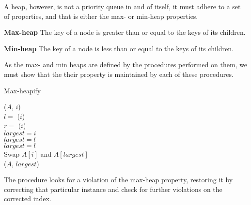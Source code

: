 A heap, however, is not a priority queue in and of itself, it must adhere to
a set of properties, and that is either the max- or min-heap properties.
\begin{description}
	\item \textbf{Max-heap} The key of a node is greater than or equal to the
keys of its children.
	\item \textbf{Min-heap} The key of a node is less than or equal to the
keys of its children.
\end{description}
As the max- and min heaps are defined by the procedures performed on them, we
must show that the their property is maintained by each of these procedures.

\begin{algorithm}[H]
	\caption{Max-heapify}
	\label{alg:max-heapify}
	
	
	
	
	\BlankLine
	\MaxHeapify($A$, $i$) \\
	\Begin
	{
		$l = $ \Left($i$) \\
		$r = $ \Right($i$) \\
		$largest = i$ \\
		{
			$largest = l$ \\
		}
		{
			$largest = l$ \\
		}
		{
			Swap $A[i]$ and $A[largest]$ \\
			\MaxHeapify($A$, $largest$)
		}
	}
\end{algorithm}
The procedure looks for a violation of the max-heap property, restoring it by
correcting that particular instance and check for further violations on the
corrected index.

